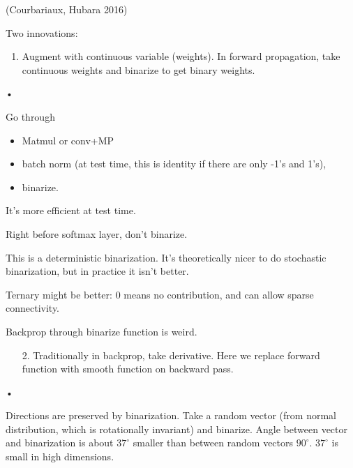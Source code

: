 \def\filepath{C:/Users/oldhe/Dropbox/Math/templates}






\pagestyle{fancy}
\chead{} 
\lfoot{} 
\cfoot{\thepage} 
\rfoot{} 
\renewcommand{\headrulewidth}{.3pt} 
\setlength\voffset{0in}
\setlength\textheight{648pt}






(Courbariaux, Hubara 2016)

Two innovations:

\begin{enumerate}
\item
Augment with continuous variable (weights). In forward propagation, take continuous weights and binarize to get binary weights.
\end{enumerate}•

Go through
\begin{itemize}
\item
Matmul or conv+MP
\item 
batch norm (at test time, this is identity if there are only -1's and 1's),
\item
binarize.
\end{itemize}
It's more efficient at test time.

Right before softmax layer, don't binarize.

This is a deterministic binarization. It's theoretically nicer to do stochastic binarization, but in practice it isn't better.

Ternary might be better: 0 means no contribution, and can allow sparse connectivity.

Backprop through binarize function is weird. 
\begin{enumerate}
\item[2.]
Traditionally in backprop, take derivative. Here we replace forward function with smooth function on backward pass.
\end{enumerate}•

Directions are preserved by binarization.  Take a random vector (from normal distribution, which is rotationally invariant) and binarize. Angle between vector and binarization is  about $37^{\circ}$ smaller than between random vectors $90^{\circ}$. $37^{\circ}$ is small in high dimensions.

